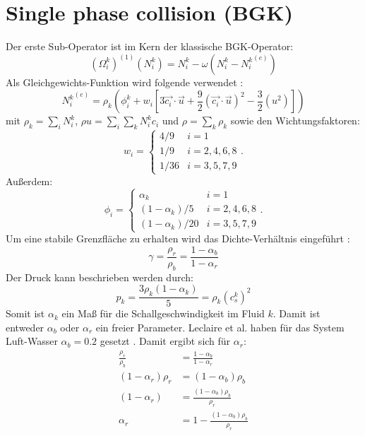 \documentclass[a4paper,10pt]{scrreprt}
\begin{document}
\section{Single phase collision (BGK)}
Der erste Sub-Operator ist im Kern der klassische BGK-Operator:
\begin{equation}
 (\Omega_i^k)^{(1)} (N_i^k) = N_i^k - \omega \left(N_i^k - {N_i^k}^{(e)} \right)
\end{equation}
Als Gleichgewichts-Funktion wird folgende verwendet \cite{Reis2007}:
\begin{equation}
\label{eq:equilibrium}
 {N_i^k}^{(e)} = \rho_k \left( \phi_i^k + w_i \left[3 \vec{c_i} \cdot \vec{u} + \frac{9}{2} (\vec{c_i} \cdot \vec{u})^2 - \frac{3}{2} (u^2) \right]  \right)
\end{equation}
mit $\rho_k = \sum_i N_i^k$, $ \rho u = \sum_i \sum_k N_i^k c_i$ und $\rho = \sum_k \rho_k$ sowie den Wichtungsfaktoren:
\begin{equation}
 w_i = \left\lbrace \begin{array}{ll} 4/9 &i = 1 \\ 1/9 & i= 2,4,6,8 \\ 1/36 & i = 3,5,7,9  \end{array}     \right. .
\end{equation}
Außerdem:
\begin{equation}
 \phi_i = \left\lbrace \begin{array}{ll} \alpha_k &i = 1 \\ (1-\alpha_k)/5 & i= 2,4,6,8 \\ (1-\alpha_k)/20 & i = 3,5,7,9  \end{array}     \right. .
\end{equation}
Um eine stabile Grenzfläche zu erhalten wird das Dichte-Verhältnis eingeführt \cite{Grunau1993,Reis2007,Leclaire2011}:
\begin{equation}
 \gamma = \frac{\rho_r}{\rho_b} = \frac{1 - \alpha_b}{1 - \alpha_r}
\end{equation}
Der Druck kann beschrieben werden durch:
\begin{equation}
 p_k = \frac{3 \rho_k (1- \alpha_k)}{5}= \rho_k (c_s^k)^2
\end{equation}
Somit ist $\alpha_k$ ein Maß für die Schallgeschwindigkeit im Fluid $k$. Damit ist entweder $\alpha_b$ oder $\alpha_r$ ein freier Parameter.
Leclaire et al. haben für das System Luft-Wasser $\alpha_b = \num{0.2}$ gesetzt \cite{Leclaire2011}. Damit ergibt sich für $\alpha_r$:
\begin{align}
 \frac{\rho_r}{\rho_b} &= \frac{1 - \alpha_b}{1 - \alpha_r} \\
(1 - \alpha_r) \rho_r & =  (1 - \alpha_b) \rho_b \\
(1 - \alpha_r) &= \frac{ (1 - \alpha_b) \rho_b}{\rho_r} \\
\alpha_r &= 1 - \frac{ (1 - \alpha_b) \rho_b}{\rho_r}
\end{align}
\end{document}
